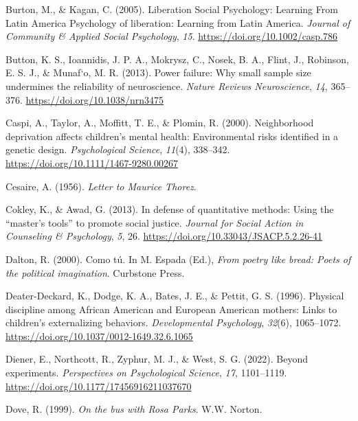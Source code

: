 \documentclass[
  letterpaper,
  DIV=11,
  numbers=noendperiod]{scrreprt}
\newlength{\cslhangindent}
\newlength{\cslentryspacingunit} %
\newenvironment{CSLReferences}[2] %
 {%
  \setlength{\parindent}{0pt}
  \ifodd #1
  \let\oldpar\par
  \def\par{\hangindent=\cslhangindent\oldpar}
  \fi
  \setlength{\parskip}{#2\cslentryspacingunit}
 }%
 {}
\begin{document}
\begin{CSLReferences}{1}{0}
\leavevmode{}%
Burton, M., \& Kagan, C. (2005). {Liberation Social Psychology: Learning
From Latin America Psychology of liberation: Learning from Latin
America}. \emph{Journal of Community \& Applied Social Psychology},
\emph{15}. \url{https://doi.org/10.1002/casp.786}

\leavevmode{}%
Button, K. S., Ioannidis, J. P. A., Mokrysz, C., Nosek, B. A., Flint,
J., Robinson, E. S. J., \& Munaf`o, M. R. (2013). Power failure: Why
small sample size undermines the reliability of neuroscience.
\emph{Nature Reviews Neuroscience}, \emph{14}, 365--376.
\url{https://doi.org/10.1038/nrn3475}

\leavevmode{}%
Caspi, A., Taylor, A., Moffitt, T. E., \& Plomin, R. (2000).
Neighborhood deprivation affects children's mental health: Environmental
risks identified in a genetic design. \emph{Psychological Science},
\emph{11}(4), 338--342. \url{https://doi.org/10.1111/1467-9280.00267}

\leavevmode{}%
Cesaire, A. (1956). \emph{Letter to {M}aurice {T}horez}.

\leavevmode{}%
Cokley, K., \& Awad, G. (2013). In defense of quantitative methods:
Using the {``master's tools''} to promote social justice. \emph{Journal
for Social Action in Counseling \& Psychology}, \emph{5}, 26.
\url{https://doi.org/10.33043/JSACP.5.2.26-41}

\leavevmode{}%
Dalton, R. (2000). Como t{ú}. In M. Espada (Ed.), \emph{From poetry like
bread: Poets of the political imagination}. Curbstone Press.

\leavevmode{}%
Deater-Deckard, K., Dodge, K. A., Bates, J. E., \& Pettit, G. S. (1996).
{Physical discipline among African American and European American
mothers: Links to children's externalizing behaviors.}
\emph{Developmental Psychology}, \emph{32}(6), 1065--1072.
\url{https://doi.org/10.1037/0012-1649.32.6.1065}

\leavevmode{}%
Diener, E., Northcott, R., Zyphur, M. J., \& West, S. G. (2022). Beyond
experiments. \emph{Perspectives on Psychological Science}, \emph{17},
1101--1119. \url{https://doi.org/10.1177/17456916211037670}

\leavevmode{}%
Dove, R. (1999). \emph{On the bus with {R}osa {P}arks}. W.W. Norton.


\end{CSLReferences}
\end{document}
